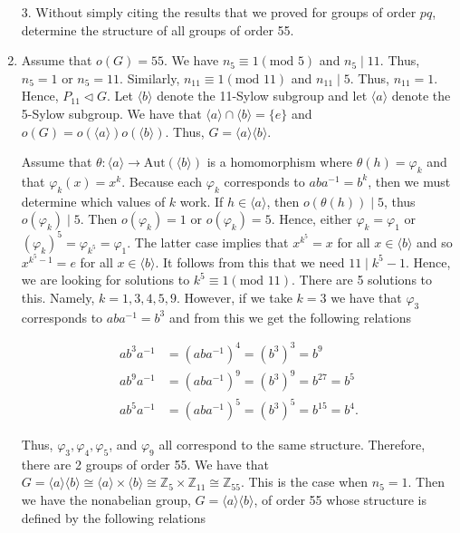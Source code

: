 \documentclass[12pt]{article}
\makeatletter
\theoremstyle{definition}
\theoremstyle{remark}
\renewenvironment{proof}[1][\proofname]{\par
  \pushQED{\qed}%
  \normalfont \topsep6\p@\@plus6\p@\relax
  \list{}{\leftmargin=0mm
          \rightmargin=4mm
          \settowidth{\itemindent}{\itshape#1}%
          \labelwidth=\itemindent
          \parsep=0pt \listparindent=\parindent 
  }
  \item[\hskip\labelsep
        \itshape
    #1\@addpunct{.}]\ignorespaces
}{%
  \popQED\endlist\@endpefalse
}
\let\oldproofname=\proofname
\renewcommand{\proofname}{\bf{\textit{\oldproofname}}}
\makeatother
\begin{document}
\begin{enumerate}[leftmargin=*]
        \item[3.] Without simply citing the results that we proved for groups of order $pq$, determine the structure of all groups of order 55.
            \begin{proof}
                Assume that $o(G)=55$. We have $n_5\equiv 1(\text{mod }5)$ and $n_5\mid 11$. Thus, $n_5=1$ or $n_5=11$. Similarly, $n_{11}\equiv 1(\text{mod }11)$ and $n_{11}\mid 5$. Thus, $n_{11}=1$. Hence, $P_{11}\triangleleft G$. Let $\langle b\rangle$ denote the 11-Sylow subgroup and let $\langle a\rangle$ denote the 5-Sylow subgroup. We have that $\langle a\rangle\cap \langle b\rangle=\{e\}$ and $o(G)=o(\langle a\rangle)o(\langle b\rangle)$. Thus, $G=\langle a\rangle\langle b\rangle$.\par\hspace{4mm} Assume that $\theta\colon\langle a\rangle\rightarrow\text{Aut}(\langle b\rangle)$ is a homomorphism where $\theta(h)=\varphi_k$ and that $\varphi_k(x)=x^k$. Because each $\varphi_k$ corresponds to $aba^{-1}=b^k$, then we must determine which values of $k$ work. If $h\in\langle a\rangle$, then $o(\theta(h))\mid 5$, thus $o(\varphi_k)\mid 5$. Then $o(\varphi_k)=1$ or $o(\varphi_k)=5$. Hence, either $\varphi_k=\varphi_1$ or $(\varphi_k)^5=\varphi_{k^5}=\varphi_1$. The latter case implies that $x^{k^5}=x$ for all $x\in\langle b\rangle$ and so $x^{k^5-1}=e$ for all $x\in\langle b\rangle$. It follows from this that we need $11\mid k^5-1$. Hence, we are looking for solutions to $k^5\equiv 1(\text{mod }11)$. There are 5 solutions to this. Namely, $k=1,3,4,5,9$. However, if we take $k=3$ we have that $\varphi_3$ corresponds to $aba^{-1}=b^3$ and from this we get the following relations
                
                    \begin{equation*}
                        \begin{split}
                            ab^3a^{-1}&=(aba^{-1})^4=(b^3)^3=b^9 \\
                            ab^9a^{-1}&=(aba^{-1})^9=(b^3)^9=b^{27}=b^5 \\
                            ab^5a^{-1}&=(aba^{-1})^5=(b^3)^5=b^{15}=b^4.
                        \end{split}
                    \end{equation*}
                
                Thus, $\varphi_3,\varphi_4,\varphi_5$, and $\varphi_9$ all correspond to the same structure. Therefore, there are 2 groups of order 55. We have that $G=\langle a\rangle\langle b\rangle\cong\langle a\rangle\times\langle b\rangle\cong\mathbb{Z}_5\times\mathbb{Z}_{11}\cong\mathbb{Z}_{55}$. This is the case when $n_5=1$. Then we have the nonabelian group, $G=\langle a\rangle\langle b\rangle$, of order 55 whose structure is defined by the following relations
                

\end{proof}
\end{enumerate}
\end{document}
